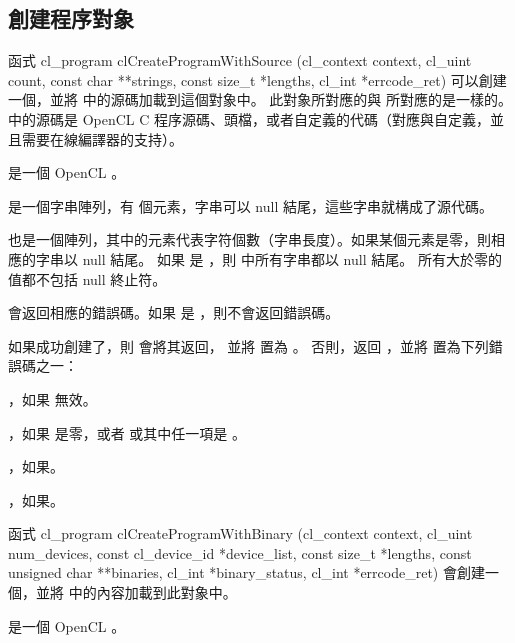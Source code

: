 \subsection{創建程序對象}

函式
\startclc
cl_program clCreateProgramWithSource (cl_context context,
			cl_uint count,
			const char **strings,
			const size_t *lengths,
			cl_int *errcode_ret)
\stopclc
可以創建一個，並將  中的源碼加載到這個對象中。
此對象所對應的與  所對應的是一樣的。
  中的源碼是 OpenCL C 程序源碼、頭檔，或者自定義的代碼（對應與自定義，並且需要在線編譯器的支持）。

 是一個 OpenCL 。

 是一個字串陣列，有  個元素，字串可以 null 結尾，這些字串就構成了源代碼。

 也是一個陣列，其中的元素代表字符個數（字串長度）。如果某個元素是零，則相應的字串以 null 結尾。
如果  是 ，則  中所有字串都以 null 結尾。
所有大於零的值都不包括 null 終止符。

 會返回相應的錯誤碼。如果  是 ，則不會返回錯誤碼。

如果成功創建了，則  會將其返回，
並將  置為 。
否則，返回 ，並將  置為下列錯誤碼之一：
\startigBase
\item {}，如果  無效。

\item {}，如果  是零，或者  或其中任一項是 。

\item {}，如果\scdevfailres。

\item {}，如果\schostfailres。
\stopigBase

函式
\startclc
cl_program clCreateProgramWithBinary (cl_context context,
			cl_uint num_devices,
			const cl_device_id *device_list,
			const size_t *lengths,
			const unsigned char **binaries,
			cl_int *binary_status,
			cl_int *errcode_ret)
\stopclc
會創建一個，並將  中的內容加載到此對象中。

 是一個 OpenCL 。

